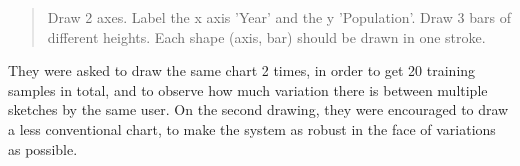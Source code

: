 	\begin{quotation}
	Draw 2 axes. Label the x axis 'Year' and the y 'Population'. Draw 3 bars of different heights. Each shape (axis, bar) should be drawn in one stroke.
	\end{quotation}
	
%	
%	
%
%	
	
	They were asked to draw the same chart 2 times, in order to get 20 training samples in total, and to observe how much variation there is between multiple sketches by the same user. On the second drawing, they were encouraged to draw a less conventional chart, to make the system as robust in the face of variations as possible. 
		

